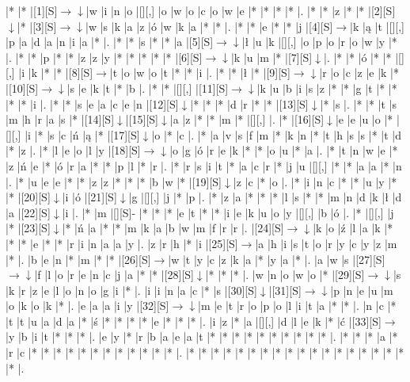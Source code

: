 \documentclass[11pt]{article}
\newcommand\drarr{$\rightarrow \!\!\!\!\! \downarrow$}
\newcommand\rarr{$\rightarrow$}
\newcommand\darr{$\downarrow$}
\begin{document}
\noindent\begin{Puzzle}{18}{31}|*	|*	|[1][S]\drarr	|w	|i	|n	|o	|[][,]{ }	|o	|w	|o	|c	|o	|w	|e	|*	|*	|*	|*	|.
|*	|*	|z	|*	|*	|[2][S]\darr	|*	|[3][S]\drarr	|w	|s	|k	|a	|z	|ó	|w	|k	|a	|*	|*	|.
|*	|*	|e	|*	|*	|j	|[4][S]\rarr	|k	|ą	|t	|[][,]{ }	|p	|a	|d	|a	|n	|i	|a	|*	|.
|*	|*	|s	|*	|*	|a	|[5][S]\drarr	|ł	|u	|k	|[][,]{ }	|o	|p	|o	|r	|o	|w	|y	|*	|.
|*	|*	|p	|*	|*	|z	|z	|y	|*	|*	|*	|*	|*	|[6][S]\drarr	|k	|u	|m	|*	|[7][S]\darr	|.
|*	|*	|ó	|*	|*	|[][,]{ }	|i	|k	|*	|*	|[8][S]\rarr	|t	|o	|w	|o	|t	|*	|*	|i	|.
|*	|*	|ł	|*	|[9][S]\drarr	|r	|o	|c	|z	|e	|k	|*	|[10][S]\drarr	|s	|e	|k	|t	|*	|b	|.
|*	|*	|[][,]{ }	|[11][S]\drarr	|k	|u	|b	|i	|s	|z	|*	|*	|g	|t	|*	|*	|*	|*	|i	|.
|*	|*	|s	|e	|a	|c	|e	|n	|[12][S]\darr	|*	|*	|*	|d	|r	|*	|*	|[13][S]\darr	|*	|s	|.
|*	|*	|t	|s	|m	|h	|r	|a	|s	|*	|[14][S]\darr	|[15][S]\darr	|a	|z	|*	|*	|m	|*	|[][,]{ }	|.
|*	|[16][S]\darr	|e	|e	|u	|o	|*	|[][,]{ }	|i	|*	|s	|c	|ń	|ą	|*	|[17][S]\darr	|o	|*	|c	|.
|*	|a	|v	|s	|f	|m	|*	|k	|n	|*	|t	|h	|s	|s	|*	|t	|d	|*	|z	|.
|*	|l	|e	|o	|l	|y	|[18][S]\drarr	|o	|g	|ó	|r	|e	|k	|*	|*	|o	|u	|*	|a	|.
|*	|t	|n	|w	|e	|*	|z	|ń	|e	|*	|ó	|r	|a	|*	|*	|p	|l	|*	|r	|.
|*	|r	|s	|i	|t	|*	|a	|c	|r	|*	|j	|u	|[][,]{ }	|*	|*	|a	|a	|*	|n	|.
|*	|u	|e	|e	|*	|*	|z	|z	|*	|*	|*	|b	|w	|*	|[19][S]\darr	|z	|c	|*	|o	|.
|*	|i	|n	|c	|*	|*	|u	|y	|*	|*	|[20][S]\darr	|i	|ó	|[21][S]\darr	|g	|[][,]{ }	|j	|*	|p	|.
|*	|z	|a	|*	|*	|*	|l	|s	|*	|*	|m	|n	|d	|k	|ł	|d	|a	|[22][S]\darr	|i	|.
|*	|m	|[][S]-	|*	|*	|*	|e	|t	|*	|*	|i	|e	|k	|u	|o	|y	|[][,]{ }	|b	|ó	|.
|*	|[][,]{ }	|j	|*	|[23][S]\darr	|*	|ń	|a	|*	|*	|m	|k	|a	|b	|w	|m	|f	|r	|r	|.
|[24][S]\drarr	|k	|o	|ź	|l	|a	|k	|*	|*	|*	|e	|*	|*	|r	|i	|n	|a	|a	|y	|.
|z	|r	|h	|*	|i	|[25][S]\rarr	|a	|h	|i	|s	|t	|o	|r	|y	|c	|y	|z	|m	|*	|.
|b	|e	|n	|*	|m	|*	|*	|[26][S]\rarr	|w	|t	|y	|c	|z	|k	|a	|*	|y	|a	|*	|.
|a	|w	|s	|[27][S]\drarr	|f	|l	|o	|r	|e	|n	|c	|j	|a	|*	|*	|[28][S]\darr	|*	|*	|*	|.
|w	|n	|o	|w	|o	|*	|[29][S]\drarr	|s	|k	|r	|z	|e	|l	|o	|n	|o	|g	|i	|*	|.
|i	|i	|n	|a	|c	|*	|s	|[30][S]\darr	|[31][S]\drarr	|p	|n	|e	|u	|m	|o	|k	|o	|k	|*	|.
|e	|a	|a	|i	|y	|[32][S]\drarr	|m	|e	|t	|r	|o	|p	|o	|l	|i	|t	|a	|*	|*	|.
|n	|c	|*	|t	|t	|u	|a	|d	|a	|*	|ś	|*	|*	|*	|*	|e	|*	|*	|*	|.
|i	|z	|*	|a	|[][,]{ }	|d	|l	|e	|k	|*	|ć	|[33][S]\rarr	|y	|b	|i	|t	|*	|*	|*	|.
|e	|y	|*	|r	|b	|a	|e	|a	|t	|*	|*	|*	|*	|*	|*	|*	|*	|*	|*	|.
|*	|*	|*	|a	|*	|r	|c	|*	|*	|*	|*	|*	|*	|*	|*	|*	|*	|*	|*	|.
|*	|*	|*	|*	|*	|*	|*	|*	|*	|*	|*	|*	|*	|*	|*	|*	|*	|*	|*	|.\end{Puzzle}

\newpage
\end{document}
